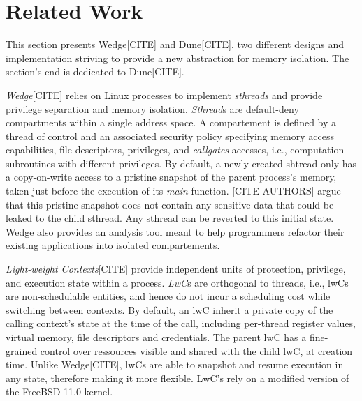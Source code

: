 \chapter{Related Work}
This section presents Wedge[CITE] and Dune[CITE], two different designs and implementation striving to provide a new abstraction for memory isolation.
The section's end is dedicated to Dune[CITE].

\textit{Wedge}[CITE] relies on Linux processes to implement \textit{sthreads} and provide 
privilege separation and memory isolation.
\textit{Sthread}s are default-deny compartments within a single address space.
A compartement is defined by a thread of control and an associated security policy specifying
memory access capabilities, file descriptors, privileges, and \textit{callgates} accesses, i.e., computation subroutines with different privileges.
By default, a newly created shtread only has a copy-on-write access to a pristine snapshot of the parent process's memory, taken just before the execution of its \textit{main} function.
[CITE AUTHORS] argue that this pristine snapshot does not contain any sensitive data that could be leaked
to the child sthread.
Any sthread can be reverted to this initial state.
Wedge also provides an analysis tool meant to help programmers refactor their existing applications into isolated compartements.

\textit{Light-weight Contexts}[CITE] provide independent units of protection, privilege, and execution state within a process.
\textit{LwC}s are orthogonal to threads, i.e., lwCs are non-schedulable entities, and hence do not incur a scheduling cost while switching between contexts.
By default, an lwC inherit a private copy of the calling context's state at the time of the call, including
per-thread register values, virtual memory, file descriptors and credentials.
The parent lwC has a fine-grained control over ressources visible and shared with the child lwC, at creation time.
Unlike Wedge[CITE], lwCs are able to snapshot and resume execution in any state, therefore making it more flexible.
LwC's rely on a modified version of the FreeBSD 11.0 kernel.


